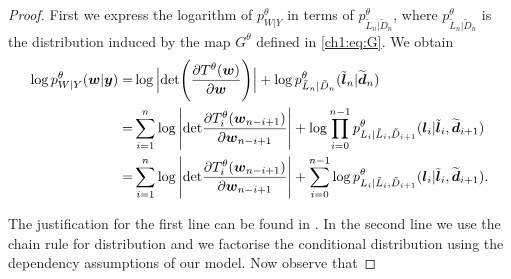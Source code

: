 \begin{proof}
    First we express the logarithm of $p^\theta_{W|Y}$ in terms of $p^\theta_{\tilde{L}_n|\tilde{D}_n}$, where  $p^\theta_{\tilde{L}_n|\tilde{D}_n}$ is the distribution induced by the map $G^\theta$ defined in \eqref{ch1:eq:G}. We obtain
    \begin{equation}\label{ch1:eq:equationone}
    \begin{aligned}
         \log p^\theta_{W|Y}(\boldsymbol{w} | \boldsymbol{y})=& \log \Big|\text{det}\Bigg(\frac{\partial T^\theta(\boldsymbol{w})}{\partial \boldsymbol{w}}\Bigg)\Big| + \log{p^\theta_{\tilde{L}_n|\tilde{D}_n}(\tilde{\boldsymbol{l}}_n|\widetilde{\boldsymbol{d}}_n)} \\ 
        =& \sum_{i=1}^{n}\log{\Bigg|\text{det}\frac{\partial T_i^{\theta}(\boldsymbol{w}_{n-i+1})}{\partial \boldsymbol{w}_{n-i+1}}\Bigg|}+ \log{\prod_{i=0}^{n-1}p^\theta_{L_i|\tilde{L}_{i},\tilde D_{i+1}}(\boldsymbol{l}_i|\tilde{\boldsymbol{l}}_{i},\widetilde {\boldsymbol{d}}_{i+1})} \\
        =& \sum_{i=1}^{n}\log{\Bigg|\text{det}\frac{\partial T_i^{\theta}(\boldsymbol{w}_{n-i+1})}{\partial \boldsymbol{w}_{n-i+1}}\Bigg|}+ \sum_{i=0}^{n-1}\log{p_{L_i|\tilde{L}_{i},\tilde D_{i+1}}^\theta(\boldsymbol{l}_i|\tilde{\boldsymbol{l}}_{i},\widetilde {\boldsymbol{d}}_{i+1})}.
    \end{aligned}
    \end{equation}
    
    The justification for the first line can be found in  \cite[Section 3]{Dual-Glow}. In the second line we use the chain rule for distribution and we factorise the conditional distribution using the dependency assumptions of our model. Now observe that
    

\end{proof}
